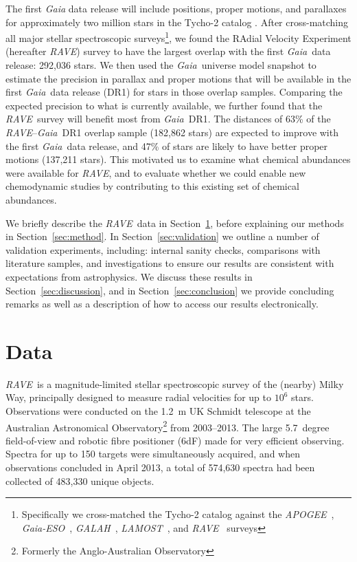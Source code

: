 \documentclass[preprint,trackchanges]{aastex}
\newcommand{\acronym}[1]{{\small{#1}}}
\newcommand{\project}[1]{\textsl{#1}}
\newcommand{\gaia}{\project{Gaia}}
\newcommand{\rave}{\project{\acronym{RAVE}}}
\newcommand{\galah}{\project{\acronym{GALAH}}}
\newcommand{\ges}{\project{Gaia-ESO}}
\newcommand{\apogee}{\project{\acronym{APOGEE}}}
\newcommand{\lamost}{\project{\acronym{LAMOST}}}
\begin{document}
The first \project{Gaia} data release will include positions, proper motions, and 
parallaxes for approximately two million stars in the Tycho-2 \citep{Hog_2000} 
catalog \citep{Michalik_2015a,Michalik_2015b}.  After cross-matching all major 
stellar spectroscopic surveys\footnote{Specifically we cross-matched the Tycho-2
catalog against the \apogee\ \citep{Zasowski_2013}, \ges\
\citep{Gilmore_2012,Randich_2013}, \galah\ \citep{DeSilva_2015},
\lamost\ \citep{Cui_2012}, and \rave\ \citep{Steinmetz_2006} 
surveys}, we found the RAdial Velocity Experiment (hereafter \rave) survey to 
have the largest overlap with the first \gaia\ data release: 292,036 
stars.  We then used the \gaia\ universe model snapshot \citep{Robin_2012} to 
estimate the precision in parallax and proper motions that will be available in 
the first \gaia\ data release (DR1) for stars in those overlap samples. Comparing
the expected precision to what is currently available, we further found that the
\rave\ survey will benefit most from \gaia\ DR1.  The distances of 63\% of the 
\rave--\gaia\ DR1 overlap sample (182,862 stars) are expected to improve with 
the first \gaia\ data release, and 47\% of stars are likely to have better 
proper motions (137,211 stars).  This motivated us to examine what chemical 
abundances were available for \rave, and to evaluate whether we could enable new 
chemodynamic studies by contributing to this existing set of chemical abundances.


We briefly describe the \rave\ data in Section~\ref{sec:data}, before explaining
our methods in Section~\ref{sec:method}.  In Section~\ref{sec:validation}
we outline a number of validation experiments, including: internal sanity checks,
comparisons with literature samples, and investigations to ensure our results
are consistent with expectations from astrophysics.  We discuss these results in
Section~\ref{sec:discussion}, and in Section~\ref{sec:conclusion} we provide 
concluding remarks as well as a description of how to access our results electronically.


\section{Data}
\label{sec:data}


\rave\ is a magnitude-limited stellar spectroscopic survey of the (nearby) Milky Way,
principally designed to measure radial velocities for up to $10^6$ stars.
Observations were conducted on the 1.2~m UK Schmidt telescope at the Australian 
Astronomical Observatory\footnote{Formerly the Anglo-Australian Observatory} from 
2003--2013.  The large 5.7~degree field-of-view and robotic fibre positioner (6dF)
made for very efficient observing.  Spectra for up to 150 targets were simultaneously
acquired, and when observations concluded in April 2013, a total of 574,630 spectra
had been collected of 483,330 unique objects. 
\end{document}

